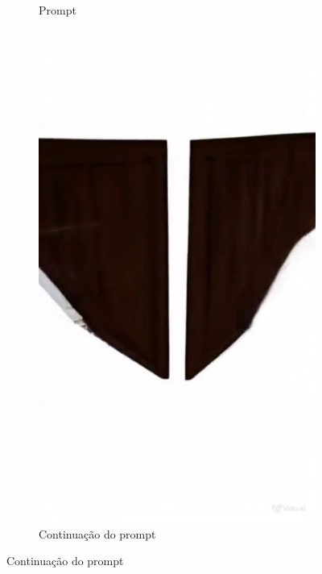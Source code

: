 \begin{figure}[htbp]
\begin{subfigure}{0.42\linewidth}
        \caption{\small Prompt}
        \label{fig:viduPorta2b}
    \end{subfigure}
    \begin{subfigure}{0.32\linewidth}
        \includegraphics[width=1\linewidth]{figs/vidu/framePorta2.jpg}
        \caption{\small Continuação do prompt}
        \label{fig:viduPorta2c}
    \end{subfigure}
\end{figure}

